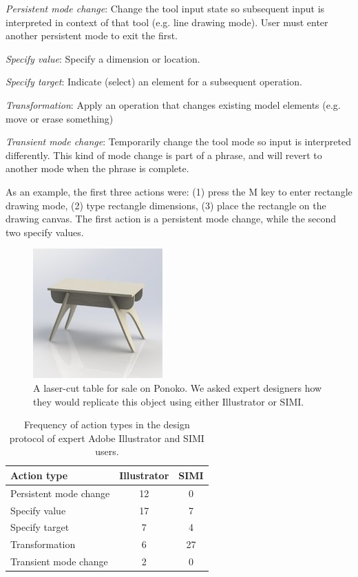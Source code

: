 \documentclass{article}
\begin{document}
\textit{Persistent mode change}: Change the tool input state so
subsequent input is interpreted in context of that tool (e.g. line
drawing mode). User must enter another persistent mode to exit the
first.

\textit{Specify value}: Specify a dimension or location.

\textit{Specify target}: Indicate (select) an element for a subsequent
operation.

\textit{Transformation}: Apply an operation that changes existing
model elements (e.g. move or erase something)

\textit{Transient mode change}: Temporarily change the tool mode so
input is interpreted differently. This kind of mode change is part of
a phrase, and will revert to another mode when the phrase is complete.

As an example, the first three actions were: (1) press the M key to
enter rectangle drawing mode, (2) type rectangle dimensions, (3) place
the rectangle on the drawing canvas. The first action is a persistent
mode change, while the second two specify values.


\begin{figure}[h]
  \centering
  \includegraphics[width=0.4\linewidth]{img/table.jpg}
  \caption{A laser-cut table for sale on Ponoko. We asked expert
    designers how they would replicate this object using either
    Illustrator or SIMI.}
  \label{fig:table}
\end{figure}

\begin{table}[h]
\centering
\begin{tabular}{ l c c }
\textbf{Action type} & \textbf{Illustrator} & \textbf{SIMI} \\
\hline
Persistent mode change & 12 & 0 \\
Specify value & 17 & 7 \\
Specify target & 7 & 4 \\
Transformation & 6 & 27 \\
Transient mode change & 2 & 0 \\
\end{tabular}
\label{tab:expert}
\caption{Frequency of action types in the design protocol of expert
  Adobe Illustrator and SIMI users. }
\end{table}
\end{document}
